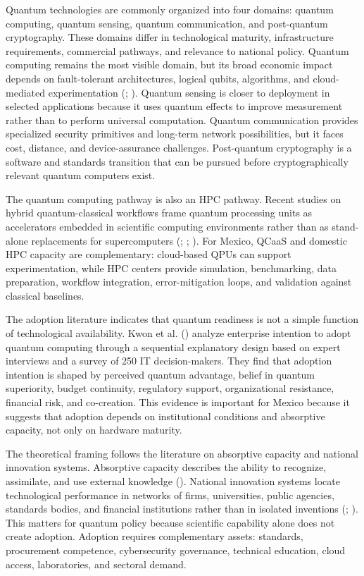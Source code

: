 \documentclass[
  11pt,
  letterpaper,
]{article}
\begin{document}
Quantum technologies are commonly organized into four domains: quantum
computing, quantum sensing, quantum communication, and post-quantum
cryptography. These domains differ in technological maturity,
infrastructure requirements, commercial pathways, and relevance to
national policy. Quantum computing remains the most visible domain, but
its broad economic impact depends on fault-tolerant architectures,
logical qubits, algorithms, and cloud-mediated experimentation
(;
). Quantum
sensing is closer to deployment in selected applications because it uses
quantum effects to improve measurement rather than to perform universal
computation. Quantum communication provides specialized security
primitives and long-term network possibilities, but it faces cost,
distance, and device-assurance challenges. Post-quantum cryptography is
a software and standards transition that can be pursued before
cryptographically relevant quantum computers exist.

The quantum computing pathway is also an HPC pathway. Recent studies on
hybrid quantum-classical workflows frame quantum processing units as
accelerators embedded in scientific computing environments rather than
as stand-alone replacements for supercomputers
(;
; ). For Mexico, QCaaS and domestic HPC capacity are
complementary: cloud-based QPUs can support experimentation, while HPC
centers provide simulation, benchmarking, data preparation, workflow
integration, error-mitigation loops, and validation against classical
baselines.

The adoption literature indicates that quantum readiness is not a simple
function of technological availability. Kwon et al.
() analyze enterprise intention to adopt
quantum computing through a sequential explanatory design based on
expert interviews and a survey of 250 IT decision-makers. They find that
adoption intention is shaped by perceived quantum advantage, belief in
quantum superiority, budget continuity, regulatory support,
organizational resistance, financial risk, and co-creation. This
evidence is important for Mexico because it suggests that adoption
depends on institutional conditions and absorptive capacity, not only on
hardware maturity.

The theoretical framing follows the literature on absorptive capacity
and national innovation systems. Absorptive capacity describes the
ability to recognize, assimilate, and use external knowledge
(). National
innovation systems locate technological performance in networks of
firms, universities, public agencies, standards bodies, and financial
institutions rather than in isolated inventions
(;
). This matters for quantum policy
because scientific capability alone does not create adoption. Adoption
requires complementary assets: standards, procurement competence,
cybersecurity governance, technical education, cloud access,
laboratories, and sectoral demand.
\end{document}
